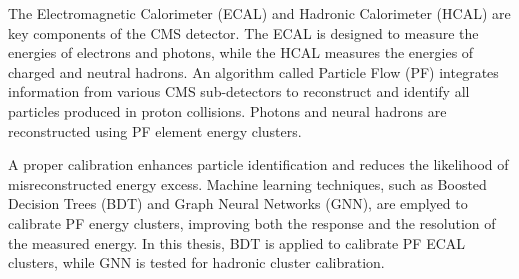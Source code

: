 
The Electromagnetic Calorimeter (ECAL) and Hadronic Calorimeter (HCAL) are key components of the CMS detector.
The ECAL is designed to measure the energies of electrons and photons, while the HCAL measures the energies of charged and neutral hadrons.
An algorithm called Particle Flow (PF) integrates information from various CMS sub-detectors to reconstruct and identify all particles produced in proton collisions.
Photons and neural hadrons are reconstructed using PF element energy clusters.

A proper calibration enhances particle identification and reduces the likelihood of misreconstructed energy excess.
Machine learning techniques, such as Boosted Decision Trees (BDT) and Graph Neural Networks (GNN), are emplyed to calibrate PF energy clusters, improving both the response and the resolution of the measured energy. 
In this thesis, BDT is applied to calibrate PF ECAL clusters, while GNN is tested for hadronic cluster calibration. %





